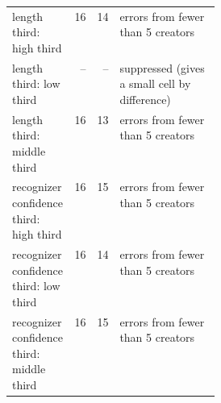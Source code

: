 {\begin{tabular}{@{}p{0.3\linewidth}rrlll@{}}
length third: high third & 16 & 14 & \multicolumn{3}{l}{errors from fewer than 5 creators} \\
length third: low third & -- & -- & \multicolumn{3}{l}{suppressed (gives a small cell by difference)} \\
length third: middle third & 16 & 13 & \multicolumn{3}{l}{errors from fewer than 5 creators} \\
recognizer confidence third: high third & 16 & 15 & \multicolumn{3}{l}{errors from fewer than 5 creators} \\
recognizer confidence third: low third & 16 & 14 & \multicolumn{3}{l}{errors from fewer than 5 creators} \\
recognizer confidence third: middle third & 16 & 15 & \multicolumn{3}{l}{errors from fewer than 5 creators} \\
\bottomrule
\end{tabular}}
